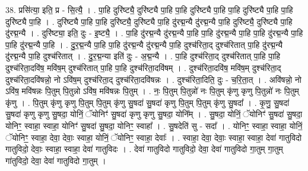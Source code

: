 \documentclass[17pt]{extarticle}
\begin{document}
38. प्रसि॑त्या॒ इति॒ प्र - सि॒त्यै॒ । . पा॒हि दुरि॑ष्ट्यै॒ दुरि॑ष्ट्यै पा॒हि पा॒हि दुरि॑ष्ट्यै पा॒हि पा॒हि दुरि॑ष्ट्यै पा॒हि पा॒हि दुरि॑ष्ट्यै पा॒हि । . दुरि॑ष्ट्यै पा॒हि पा॒हि दुरि॑ष्ट्यै॒ दुरि॑ष्ट्यै पा॒हि दु॑रद्म॒न्यै दु॑रद्म॒न्यै पा॒हि दुरि॑ष्ट्यै॒ दुरि॑ष्ट्यै पा॒हि दु॑रद्म॒न्यै । . दुरि॑ष्ट्या॒ इति॒ दुः - इ॒ष्ट्यै॒ । . पा॒हि दु॑रद्म॒न्यै दु॑रद्म॒न्यै पा॒हि पा॒हि दु॑रद्म॒न्यै पा॒हि पा॒हि दु॑रद्म॒न्यै पा॒हि पा॒हि दु॑रद्म॒न्यै पा॒हि । . दु॒र॒द्म॒न्यै पा॒हि पा॒हि दु॑रद्म॒न्यै दु॑रद्म॒न्यै पा॒हि दुश्च॑रिता॒द् दुश्च॑रितात् पा॒हि दु॑रद्म॒न्यै दु॑रद्म॒न्यै पा॒हि दुश्च॑रितात् । . दु॒र॒द्म॒न्या इति॑ दुः - अ॒द्म॒न्यै । . पा॒हि दुश्च॑रिता॒द् दुश्च॑रितात् पा॒हि पा॒हि दुश्च॑रिता॒दवि॑ष॒ मवि॑ष॒म् दुश्च॑रितात् पा॒हि पा॒हि दुश्च॑रिता॒दवि॑षम् । . दुश्च॑रिता॒दवि॑ष॒ मवि॑ष॒म् दुश्च॑रिता॒द् दुश्च॑रिता॒दवि॑षन्नो॒ नो ऽवि॑ष॒म् दुश्च॑रिता॒द् दुश्च॑रिता॒दवि॑षन्नः । . दुश्च॑रिता॒दिति॒ दुः - च॒रि॒ता॒त् । . अवि॑षन्नो॒ नो ऽवि॑ष॒ मवि॑षन्नः पि॒तुम् पि॒तुन्नो ऽवि॑ष॒ मवि॑षन्नः पि॒तुम् । . नः॒ पि॒तुम् पि॒तुन्नो॑ नः पि॒तुम् कृ॑णु कृणु पि॒तुन्नो॑ नः पि॒तुम् कृ॑णु । . पि॒तुम् कृ॑णु कृणु पि॒तुम् पि॒तुम् कृ॑णु सु॒षदा॑ सु॒षदा॑ कृणु पि॒तुम् पि॒तुम् कृ॑णु सु॒षदा᳚ । . कृ॒णु॒ सु॒षदा॑ सु॒षदा॑ कृणु कृणु सु॒षदा॒ योनिं॒ ॅयोनिꣳ॑ सु॒षदा॑ कृणु कृणु सु॒षदा॒ योनि᳚म् । . सु॒षदा॒ योनिं॒ ॅयोनिꣳ॑ सु॒षदा॑ सु॒षदा॒ योनिꣳ॒॒ स्वाहा॒ स्वाहा॒ योनिꣳ॑ सु॒षदा॑ सु॒षदा॒ योनिꣳ॒॒ स्वाहा᳚ । . सु॒षदेति॑ सु - सदा᳚ । . योनिꣳ॒॒ स्वाहा॒ स्वाहा॒ योनिं॒ ॅयोनिꣳ॒॒ स्वाहा॒ देवा॒ देवाः॒ स्वाहा॒ योनिं॒ ॅयोनिꣳ॒॒ स्वाहा॒ देवाः᳚ । . स्वाहा॒ देवा॒ देवाः॒ स्वाहा॒ स्वाहा॒ देवा॑ गातुविदो गातुविदो॒ देवाः॒ स्वाहा॒ स्वाहा॒ देवा॑ गातुविदः । . देवा॑ गातुविदो गातुविदो॒ देवा॒ देवा॑ गातुविदो गा॒तुम् गा॒तुम् गा॑तुविदो॒ देवा॒ देवा॑ गातुविदो गा॒तुम् । \newline
\end{document}
